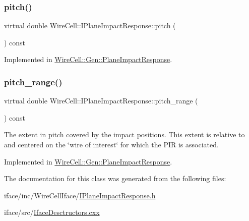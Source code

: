 \mbox{\label{class_wire_cell_1_1_i_plane_impact_response_ad8fcf3440976f14b05debbbf6d743d88}} 
\subsubsection{\texorpdfstring{pitch()}{pitch()}}
{\footnotesize\ttfamily virtual double Wire\+Cell\+::\+I\+Plane\+Impact\+Response\+::pitch (\begin{DoxyParamCaption}{ }\end{DoxyParamCaption}) const\hspace{0.3cm}{\ttfamily [pure virtual]}}



Implemented in \hyperlink{class_wire_cell_1_1_gen_1_1_plane_impact_response_a350984012f21b48b8ab4515a371a3f8c}{Wire\+Cell\+::\+Gen\+::\+Plane\+Impact\+Response}.

\mbox{\label{class_wire_cell_1_1_i_plane_impact_response_a2145d23de537013749fb0cbe822ad7c2}} 
\subsubsection{\texorpdfstring{pitch\+\_\+range()}{pitch\_range()}}
{\footnotesize\ttfamily virtual double Wire\+Cell\+::\+I\+Plane\+Impact\+Response\+::pitch\+\_\+range (\begin{DoxyParamCaption}{ }\end{DoxyParamCaption}) const\hspace{0.3cm}{\ttfamily [pure virtual]}}

The extent in pitch covered by the impact positions. This extent is relative to and centered on the \char`\"{}wire of
interest\char`\"{} for which the P\+IR is associated. 

Implemented in \hyperlink{class_wire_cell_1_1_gen_1_1_plane_impact_response_a6d35e0f23850e8b5922216bae603af5e}{Wire\+Cell\+::\+Gen\+::\+Plane\+Impact\+Response}.



The documentation for this class was generated from the following files\+:\begin{DoxyCompactItemize}
\item 
iface/inc/\+Wire\+Cell\+Iface/\hyperlink{_i_plane_impact_response_8h}{I\+Plane\+Impact\+Response.\+h}\item 
iface/src/\hyperlink{_iface_desctructors_8cxx}{Iface\+Desctructors.\+cxx}\end{DoxyCompactItemize}
